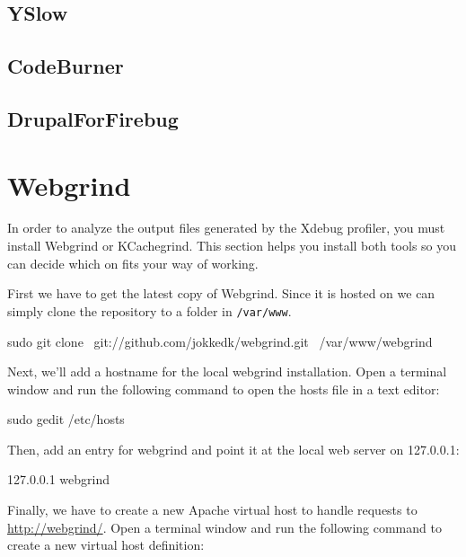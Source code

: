 \documentclass[final,ebook,10pt,twoside,openright]{memoir}
\begin{document}
\subsection{YSlow}

\subsection{CodeBurner}

\subsection{DrupalForFirebug}


\section{Webgrind}
\label{sec:Webgrind}

In order to analyze the output files generated by the Xdebug profiler, you must install Webgrind or KCachegrind. This section helps you install both tools so you can decide which on fits your way of working.

First we have to get the latest copy of Webgrind. Since it is hosted on  we can simply clone the repository to a folder in \verb!/var/www!.

\begin{squashboxcommand}
sudo git clone \
  git://github.com/jokkedk/webgrind.git \
  /var/www/webgrind
\end{squashboxcommand}

Next, we’ll add a hostname for the local webgrind installation. Open a terminal window and run the following command to open the hosts file in a text editor:

\begin{squashboxcommand}
sudo gedit /etc/hosts
\end{squashboxcommand}

Then, add an entry for webgrind and point it at the local web server on 127.0.0.1:

\begin{squashboxoutput}
127.0.0.1   webgrind
\end{squashboxoutput}

Finally, we have to create a new Apache virtual host to handle requests to \url{http://webgrind/}. Open a terminal window and run the following command to create a new virtual host definition:
\end{document}
